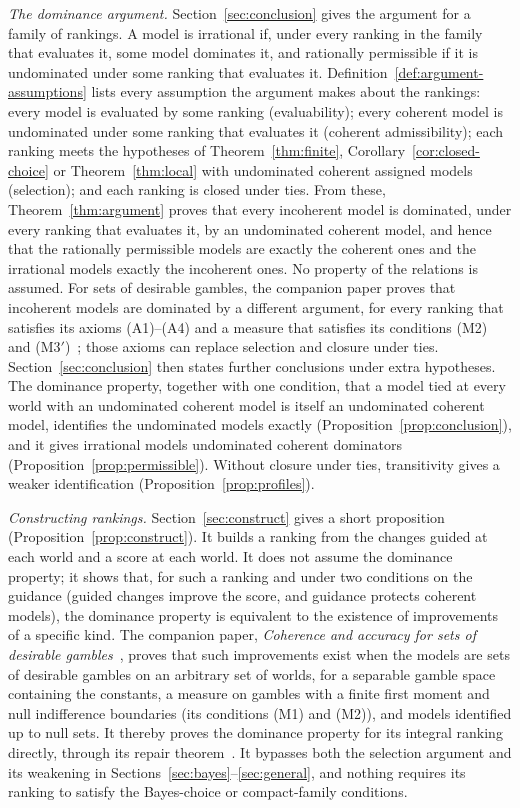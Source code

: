\documentclass[11pt]{article}
\theoremstyle{definition}
\theoremstyle{remark}
\begin{document}
\emph{The dominance argument.} Section~\ref{sec:conclusion} gives the argument for a family of rankings. A model is irrational if, under every ranking in the family that evaluates it, some model dominates it, and rationally permissible if it is undominated under some ranking that evaluates it. Definition~\ref{def:argument-assumptions} lists every assumption the argument makes about the rankings: every model is evaluated by some ranking (evaluability); every coherent model is undominated under some ranking that evaluates it (coherent admissibility); each ranking meets the hypotheses of Theorem~\ref{thm:finite}, Corollary~\ref{cor:closed-choice} or Theorem~\ref{thm:local} with undominated coherent assigned models (selection); and each ranking is closed under ties. From these, Theorem~\ref{thm:argument} proves that every incoherent model is dominated, under every ranking that evaluates it, by an undominated coherent model, and hence that the rationally permissible models are exactly the coherent ones and the irrational models exactly the incoherent ones. No property of the relations is assumed. For sets of desirable gambles, the companion paper proves that incoherent models are dominated by a different argument, for every ranking that satisfies its axioms (A1)--(A4) and a measure that satisfies its conditions (M2) and (M3$'$)~\cite[Theorem~4.1]{KCM}; those axioms can replace selection and closure under ties. Section~\ref{sec:conclusion} then states further conclusions under extra hypotheses. The dominance property, together with one condition, that a model tied at every world with an undominated coherent model is itself an undominated coherent model, identifies the undominated models exactly (Proposition~\ref{prop:conclusion}), and it gives irrational models undominated coherent dominators (Proposition~\ref{prop:permissible}). Without closure under ties, transitivity gives a weaker identification (Proposition~\ref{prop:profiles}).

\emph{Constructing rankings.} Section~\ref{sec:construct} gives a short proposition (Proposition~\ref{prop:construct}). It builds a ranking from the changes guided at each world and a score at each world. It does not assume the dominance property; it shows that, for such a ranking and under two conditions on the guidance (guided changes improve the score, and guidance protects coherent models), the dominance property is equivalent to the existence of improvements of a specific kind. The companion paper, \emph{Coherence and accuracy for sets of desirable gambles}~\cite{KCM}, proves that such improvements exist when the models are sets of desirable gambles on an arbitrary set of worlds, for a separable gamble space containing the constants, a measure on gambles with a finite first moment and null indifference boundaries (its conditions (M1) and (M2)), and models identified up to null sets. It thereby proves the dominance property for its integral ranking directly, through its repair theorem~\cite[Theorem~6.8 and Corollary~6.9]{KCM}. It bypasses both the selection argument and its weakening in Sections~\ref{sec:bayes}--\ref{sec:general}, and nothing requires its ranking to satisfy the Bayes-choice or compact-family conditions.
\end{document}
